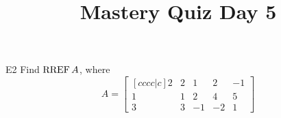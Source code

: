 \documentclass{sbgLAquiz}
\title{Mastery Quiz Day 5 }
\begin{document}
\begin{problem}{E2}
Find \(\operatorname{RREF} A\), where
\[
  A =
  \begin{bmatrix}[cccc|c]
    2 & 2 & 1 & 2 & -1 \\
    1 & 1 & 2 & 4 & 5 \\
    3 & 3 & -1 & -2 & 1
  \end{bmatrix}
\]
\end{problem}
\end{document}
